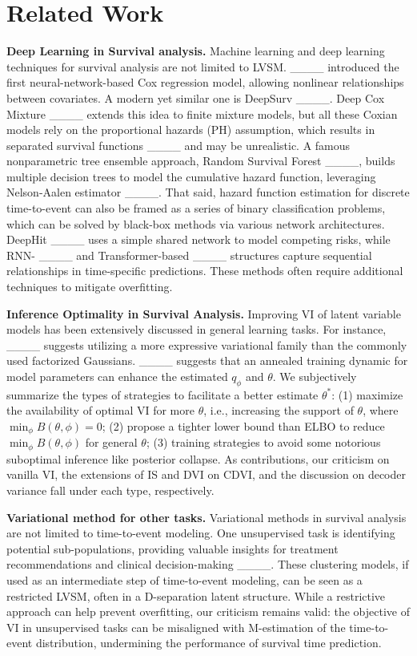 \section{Related Work}
\textbf{Deep Learning in Survival analysis.} Machine learning and deep learning techniques for survival analysis are not limited to LVSM. ____ introduced the first neural-network-based Cox regression model, allowing nonlinear relationships between covariates. A modern yet similar one is DeepSurv ____. Deep Cox Mixture ____ extends this idea to finite mixture models, but all these Coxian models rely on the proportional hazards (PH) assumption, which results in separated survival functions ____ and may be unrealistic. A famous nonparametric tree ensemble approach, Random Survival Forest ____, builds multiple decision trees to model the cumulative hazard function, leveraging Nelson-Aalen estimator ____. That said, hazard function estimation for discrete time-to-event can also be framed as a series of binary classification problems, which can be solved by black-box methods via various network architectures. DeepHit ____ uses a simple shared network to model competing risks, while RNN- ____ and Transformer-based ____ structures capture sequential relationships in time-specific predictions. These methods often require additional techniques to mitigate overfitting.

\textbf{Inference Optimality in Survival Analysis.} Improving VI of latent variable models has been extensively discussed in general learning tasks. For instance, ____ suggests utilizing a more expressive variational family than the commonly used factorized Gaussians. ____ suggests that an annealed training dynamic for model parameters can enhance the estimated $q_\phi$ and $\theta$. We subjectively summarize the types of strategies to facilitate a better estimate $\theta^*$: (1) maximize the availability of optimal VI for more $\theta$, i.e., increasing the support of $\theta$, where $\min_{\phi} B(\theta,\phi)=0$;  (2) propose a tighter lower bound than ELBO to reduce $\min_{\phi} B(\theta,\phi)$ for general $\theta$; (3) training strategies to avoid some notorious suboptimal inference like posterior collapse. %
As contributions, our criticism on vanilla VI, the extensions of IS and DVI on CDVI, and the discussion on decoder variance fall under each type, respectively.

\textbf{Variational method for other tasks.} Variational methods in survival analysis are not limited to time-to-event modeling. One unsupervised task is identifying potential sub-populations, providing valuable insights for treatment recommendations and clinical decision-making ____. These clustering models, if used as an intermediate step of time-to-event modeling, can be seen as a restricted LVSM, often in a D-separation latent structure. While a restrictive approach can help prevent overfitting, our criticism remains valid: the objective of VI in unsupervised tasks can be misaligned with M-estimation of the time-to-event distribution, undermining the performance of survival time prediction. 
\vspace{-5pt}